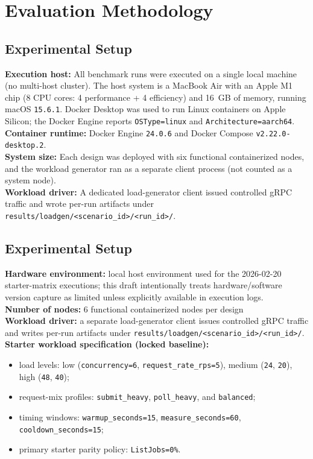 \documentclass[11pt]{article}
\begin{document}
\section{Evaluation Methodology}
\subsection{Experimental Setup}
\textbf{Execution host:} All benchmark runs were executed on a single local machine (no multi-host cluster).
The host system is a MacBook Air with an Apple M1 chip (8 CPU cores: 4 performance + 4 efficiency) and \SI{16}{GB} of memory, running macOS \texttt{15.6.1}.
Docker Desktop was used to run Linux containers on Apple Silicon; the Docker Engine reports \texttt{OSType=linux} and \texttt{Architecture=aarch64}.\\

\noindent
\textbf{Container runtime:} Docker Engine \texttt{24.0.6} and Docker Compose \texttt{v2.22.0-desktop.2}.\\

\noindent
\textbf{System size:} Each design was deployed with six functional containerized nodes, and the workload generator ran as a separate client process (not counted as a system node).\\

\noindent
\textbf{Workload driver:} A dedicated load-generator client issued controlled gRPC traffic and wrote per-run artifacts under \texttt{results/loadgen/<scenario\_id>/<run\_id>/}.

\subsection{Experimental Setup}
\textbf{Hardware environment:} local host environment used for the 2026-02-20 starter-matrix executions; this draft intentionally treats hardware/software version capture as limited unless explicitly available in execution logs.\\
\textbf{Number of nodes:} 6 functional containerized nodes per design\\
\textbf{Workload driver:} a separate load-generator client issues controlled gRPC traffic and writes per-run artifacts under \texttt{results/loadgen/<scenario\_id>/<run\_id>/}.\\
\textbf{Starter workload specification (locked baseline):}
\begin{itemize}
    \item load levels: low (\texttt{concurrency=6}, \texttt{request\_rate\_rps=5}), medium (\texttt{24}, \texttt{20}), high (\texttt{48}, \texttt{40});
    \item request-mix profiles: \texttt{submit\_heavy}, \texttt{poll\_heavy}, and \texttt{balanced};
    \item timing windows: \texttt{warmup\_seconds=15}, \texttt{measure\_seconds=60}, \texttt{cooldown\_seconds=15};
    \item primary starter parity policy: \texttt{ListJobs=0\%}.
\end{itemize}
\end{document}
